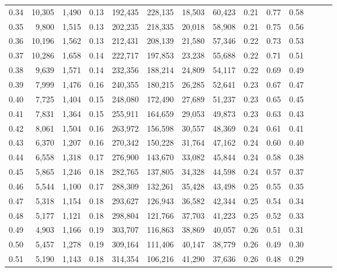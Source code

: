 \begin{tabular}{rrrrrrrrrrrrrr}
0.34 &  10,305 &  1,490 &  0.13 &  192,435 &  228,135 &  18,503 &  60,423 &  0.21 &  0.77 &      0.58 \\
0.35 &   9,800 &  1,515 &  0.13 &  202,235 &  218,335 &  20,018 &  58,908 &  0.21 &  0.75 &      0.56 \\
0.36 &  10,196 &  1,562 &  0.13 &  212,431 &  208,139 &  21,580 &  57,346 &  0.22 &  0.73 &      0.53 \\
0.37 &  10,286 &  1,658 &  0.14 &  222,717 &  197,853 &  23,238 &  55,688 &  0.22 &  0.71 &      0.51 \\
0.38 &   9,639 &  1,571 &  0.14 &  232,356 &  188,214 &  24,809 &  54,117 &  0.22 &  0.69 &      0.49 \\
0.39 &   7,999 &  1,476 &  0.16 &  240,355 &  180,215 &  26,285 &  52,641 &  0.23 &  0.67 &      0.47 \\
0.40 &   7,725 &  1,404 &  0.15 &  248,080 &  172,490 &  27,689 &  51,237 &  0.23 &  0.65 &      0.45 \\
0.41 &   7,831 &  1,364 &  0.15 &  255,911 &  164,659 &  29,053 &  49,873 &  0.23 &  0.63 &      0.43 \\
0.42 &   8,061 &  1,504 &  0.16 &  263,972 &  156,598 &  30,557 &  48,369 &  0.24 &  0.61 &      0.41 \\
0.43 &   6,370 &  1,207 &  0.16 &  270,342 &  150,228 &  31,764 &  47,162 &  0.24 &  0.60 &      0.40 \\
0.44 &   6,558 &  1,318 &  0.17 &  276,900 &  143,670 &  33,082 &  45,844 &  0.24 &  0.58 &      0.38 \\
0.45 &   5,865 &  1,246 &  0.18 &  282,765 &  137,805 &  34,328 &  44,598 &  0.24 &  0.57 &      0.37 \\
0.46 &   5,544 &  1,100 &  0.17 &  288,309 &  132,261 &  35,428 &  43,498 &  0.25 &  0.55 &      0.35 \\
0.47 &   5,318 &  1,154 &  0.18 &  293,627 &  126,943 &  36,582 &  42,344 &  0.25 &  0.54 &      0.34 \\
0.48 &   5,177 &  1,121 &  0.18 &  298,804 &  121,766 &  37,703 &  41,223 &  0.25 &  0.52 &      0.33 \\
0.49 &   4,903 &  1,166 &  0.19 &  303,707 &  116,863 &  38,869 &  40,057 &  0.26 &  0.51 &      0.31 \\
0.50 &   5,457 &  1,278 &  0.19 &  309,164 &  111,406 &  40,147 &  38,779 &  0.26 &  0.49 &      0.30 \\
0.51 &   5,190 &  1,143 &  0.18 &  314,354 &  106,216 &  41,290 &  37,636 &  0.26 &  0.48 &      0.29 \\

\end{tabular}
